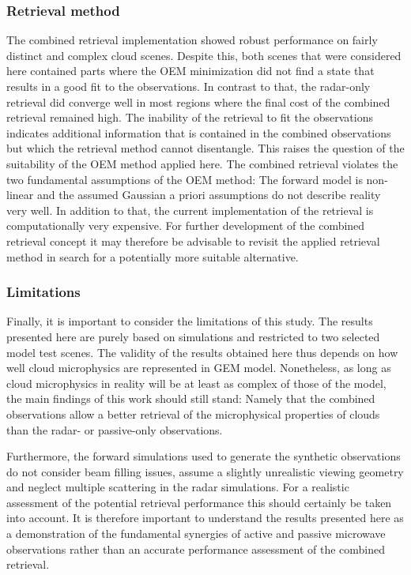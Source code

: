 \documentclass[journal abbreviation, manuscript]{copernicus}
\begin{document}
\subsubsection{Retrieval method}

The combined retrieval implementation showed robust performance on fairly
distinct and complex cloud scenes. Despite this, both scenes that were
considered here contained parts where the OEM minimization did not find a state
that results in a good fit to the observations. In contrast to that, the
radar-only retrieval did converge well in most regions where the final cost of
the combined retrieval remained high. The inability of the retrieval to fit the
observations indicates additional information that is contained in the
combined observations but which the retrieval method cannot disentangle. This
raises the question of the suitability of the OEM method applied here. The
combined retrieval violates the two fundamental assumptions of the OEM method:
The forward model is non-linear and the assumed Gaussian a priori assumptions do
not describe reality very well. In addition to that, the current implementation
of the retrieval is computationally very expensive. For further development of
the combined retrieval concept it may therefore be advisable to revisit the
applied retrieval method in search for a potentially more suitable alternative.

\subsubsection{Limitations}

Finally, it is important to consider the limitations of this study. The results
presented here are purely based on simulations and restricted to two selected
model test scenes. The validity of the results obtained here thus depends on how
well cloud microphysics are represented in GEM model. Nonetheless, as long as
cloud microphysics in reality will be at least as complex of those of the model,
the main findings of this work should still stand: Namely that the combined
observations allow a better retrieval of the microphysical properties of clouds
than the radar- or passive-only observations.

Furthermore, the forward simulations used to generate the synthetic observations
do not consider beam filling issues, assume a slightly unrealistic viewing
geometry and neglect multiple scattering in the radar simulations. For a
realistic assessment of the potential retrieval performance this should
certainly be taken into account. It is therefore important to understand the
results presented here as a demonstration of the fundamental synergies of active
and passive microwave observations rather than an accurate performance
assessment of the combined retrieval.
\end{document}
